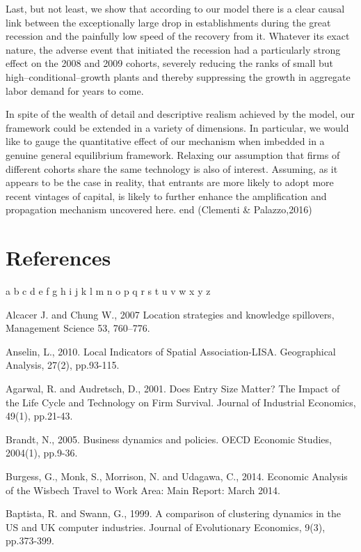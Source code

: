 \documentclass[
  12pt,
  oneside]{book}
\begin{document}
Last, but not least, we show that according to our model there is a clear causal link between the exceptionally large drop in establishments during the great recession and the painfully low speed of the recovery from it. Whatever its exact nature, the adverse event that initiated the recession had a particularly strong effect on the 2008 and 2009 cohorts, severely reducing the ranks of small but high--conditional--growth plants and thereby suppressing the growth in aggregate labor demand for years to come.

In spite of the wealth of detail and descriptive realism achieved by the model, our framework could be extended in a variety of dimensions. In particular, we would like to gauge the quantitative effect of our mechanism when imbedded in a genuine general equilibrium framework. Relaxing our assumption that firms of different cohorts share the same technology is also of interest. Assuming, as it appears to be the case in reality, that entrants are more likely to adopt more recent vintages of capital, is likely to further enhance the amplification and propagation mechanism uncovered here.
end (Clementi \& Palazzo,2016)

\hypertarget{references}{%
\chapter*{References}\label{references}}

a b c d e f g h i j k l m n o p q r s t u v w x y z

Alcacer J. and Chung W., 2007 Location strategies and knowledge spillovers, Management Science 53, 760--776.

Anselin, L., 2010. Local Indicators of Spatial Association-LISA. Geographical Analysis, 27(2), pp.93-115.

Agarwal, R. and Audretsch, D., 2001. Does Entry Size Matter? The Impact of the Life Cycle and Technology on Firm Survival. Journal of Industrial Economics, 49(1), pp.21-43.

Brandt, N., 2005. Business dynamics and policies. OECD Economic Studies, 2004(1), pp.9-36.

Burgess, G., Monk, S., Morrison, N. and Udagawa, C., 2014. Economic Analysis of the Wisbech Travel to Work Area: Main Report: March 2014.

Baptista, R. and Swann, G., 1999. A comparison of clustering dynamics in the US and UK computer industries. Journal of Evolutionary Economics, 9(3), pp.373-399.
\end{document}
